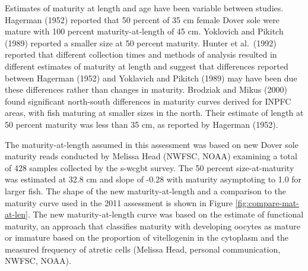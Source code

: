 \documentclass[11pt,
  english,
  a4paper,
]{article}
\begin{document}
Estimates of maturity at length and age have been variable between studies. Hagerman {(1952)\leavevmode\tagmcend\tagstructend} reported that 50 percent of 35 cm female Dover sole were mature with 100 percent maturity-at-length of 45 cm. Yoklovich and Pikitch {(1989)\leavevmode\tagmcend\tagstructend} reported a smaller size at 50 percent maturity. Hunter et al.~{(1992)\leavevmode\tagmcend\tagstructend} reported that different collection times and methods of analysis resulted in different estimates of maturity at length and suggest that differences reported between Hagerman {(1952)\leavevmode\tagmcend\tagstructend} and Yoklavich and Pikitch {(1989)\leavevmode\tagmcend\tagstructend} may have been due these differences rather than changes in maturity. Brodziak and Mikus {(2000)\leavevmode\tagmcend\tagstructend} found significant north-south differences in maturity curves derived for INPFC areas, with fish maturing at smaller sizes in the north. Their estimate of length at 50 percent maturity was less than 35 cm, as reported by Hagerman {(1952)\leavevmode\tagmcend\tagstructend}.

\leavevmode\tagmcend\tagstructend\par


The maturity-at-length assumed in this assessment was based on new Dover sole maturity reads conducted by Melissa Head (NWFSC, NOAA) examining a total of 428 samples collected by the \gls{s-wcgbt} survey. The 50 percent size-at-maturity was estimated at 32.8 cm and slope of -0.28 with maturity asymptoting to 1.0 for larger fish. The shape of the new maturity-at-length and a comparison to the maturity curve used in the 2011 assessment is shown in Figure \ref{fig:compare-mat-at-len}. The new maturity-at-length curve was based on the estimate of functional maturity, an approach that classifies maturity with developing oocytes as mature or immature based on the proportion of vitellogenin in the cytoplasm and the measured frequency of atretic cells (Melissa Head, personal communication, NWFSC, NOAA).

\leavevmode\tagmcend\tagstructend\par
\end{document}
